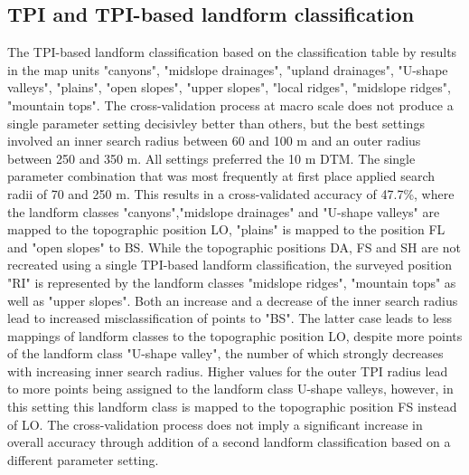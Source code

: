 \documentclass[preprint,12pt,authoryear]{elsarticle}
\begin{document}
\subsection{TPI and TPI-based landform classification}
The TPI-based landform classification based on the  classification table by \cite{Weiss2000} results in the map units "canyons", "midslope drainages", "upland drainages", "U-shape valleys", "plains", "open slopes", "upper slopes", "local ridges", "midslope ridges", "mountain tops". The cross-validation process at macro scale does not produce a single parameter setting decisivley better than others, but the best settings involved an inner search radius between 60 and 100 m and an outer radius between 250  and 350 m. All settings preferred the 10 m DTM. The single parameter combination that was most frequently at first place applied search radii of 70 and 250 m. This results in a cross-validated accuracy of 47.7\%, where the landform classes "canyons","midslope drainages" and "U-shape valleys" are mapped to the topographic position LO, "plains" is mapped to the position FL and "open slopes" to BS. While the topographic positions DA, FS and SH are not recreated using a single TPI-based landform classification, the surveyed position "RI" is represented by the landform classes "midslope ridges", "mountain tops" as well as "upper slopes". Both an increase and a decrease of the inner search radius lead to increased misclassification of points to "BS". The latter case leads to less mappings of landform classes to the topographic position LO, despite more points of the landform class "U-shape valley", the number of which strongly decreases with increasing inner search radius. Higher values for the outer TPI radius lead to more points being assigned to the landform class U-shape valleys, however, in this setting this landform class is mapped to the topographic position FS instead of LO. The cross-validation process does not imply a significant increase in overall accuracy through addition of a second landform classification based on a different parameter setting.   
\end{document}
